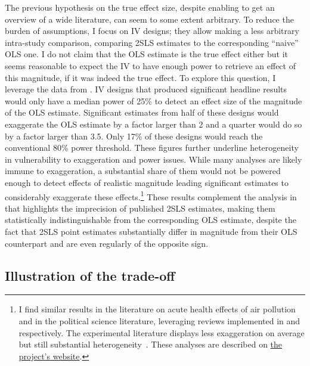 \documentclass[usletter, 12pt]{article}
\begin{document}
			The previous hypothesis on the true effect size, despite enabling to get an overview of a wide literature, can seem to some extent arbitrary. To reduce the burden of assumptions, I focus on IV designs; they allow making a less arbitrary intra-study comparison, comparing 2SLS estimates to the corresponding ``naive'' OLS one. I do not claim that the OLS estimate is the true effect either but it seems reasonable to expect the IV to have enough power to retrieve an effect of this magnitude, if it was indeed the true effect. To explore this question, I leverage the data from \cite{youngConsistencyInferenceInstrumental2022}. IV designs that produced significant headline results would only have a median power of 25\% to detect an effect size of the magnitude of the OLS estimate. Significant estimates from half of these designs would exaggerate the OLS estimate by a factor larger than 2 and a quarter would do so by a factor larger than 3.5. Only 17\% of these designs would reach the conventional 80\% power threshold. These figures further underline heterogeneity in vulnerability to exaggeration and power issues. While many analyses are likely immune to exaggeration, a substantial share of them would not be powered enough to detect effects of realistic magnitude leading significant estimates to considerably exaggerate these effects.\footnote{I find similar results in the literature on acute health effects of air pollution and in the political science literature, leveraging reviews implemented in \cite{bagilet_accurate_2023} and \cite{lalHow2024} respectively. The experimental literature displays less exaggeration on average but still substantial heterogeneity \cite{camerer_evaluating_2016}. These analyses are described on \href{https://vincentbagilet.github.io/causal_exaggeration/lit_IVs.html}{the project's website}.} These results complement the analysis in \cite{youngConsistencyInferenceInstrumental2022} that highlights the imprecision of published 2SLS estimates, making them statistically indistinguishable from the corresponding OLS estimate, despite the fact that 2SLS point estimates substantially differ in magnitude from their OLS counterpart and are even regularly  of the opposite sign. %
			
	\subsection{Illustration of the trade-off}
	
\end{document}
